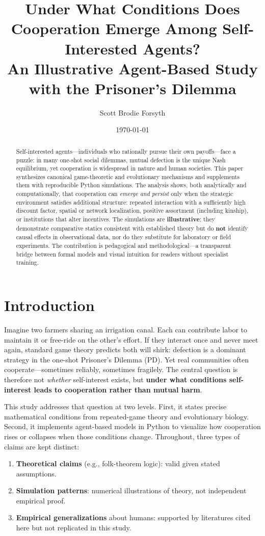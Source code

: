 \documentclass[11pt,a4paper]{article}
\title{\textbf{Under What Conditions Does Cooperation Emerge Among Self-Interested Agents?}\\[0.4em]
\large An Illustrative Agent-Based Study with the Prisoner's Dilemma}
\author{Scott Brodie Forsyth}
\date{\today}
\begin{document}
\maketitle

\begin{abstract}
Self-interested agents---individuals who rationally pursue their own payoffs---face a puzzle: in many one-shot social dilemmas, mutual defection is the unique Nash equilibrium, yet cooperation is widespread in nature and human societies. This paper synthesizes canonical game-theoretic and evolutionary mechanisms and supplements them with reproducible Python simulations. The analysis shows, both analytically and computationally, that cooperation can \emph{emerge and persist} only when the strategic environment satisfies additional structure: repeated interaction with a sufficiently high discount factor, spatial or network localization, positive assortment (including kinship), or institutions that alter incentives. The simulations are \textbf{illustrative}: they demonstrate comparative statics consistent with established theory but do \textbf{not} identify causal effects in observational data, nor do they substitute for laboratory or field experiments. The contribution is pedagogical and methodological---a transparent bridge between formal models and visual intuition for readers without specialist training.
\end{abstract}

\section{Introduction}

Imagine two farmers sharing an irrigation canal. Each can contribute labor to maintain it or free-ride on the other's effort. If they interact once and never meet again, standard game theory predicts both will shirk: defection is a dominant strategy in the one-shot Prisoner's Dilemma (PD). Yet real communities often cooperate---sometimes reliably, sometimes fragilely. The central question is therefore not \emph{whether} self-interest exists, but \textbf{under what conditions self-interest leads to cooperation rather than mutual harm}.

This study addresses that question at two levels. First, it states precise mathematical conditions from repeated-game theory and evolutionary biology. Second, it implements agent-based models in Python to visualize how cooperation rises or collapses when those conditions change. Throughout, three types of claims are kept distinct:
\begin{enumerate}[noitemsep]
  \item \textbf{Theoretical claims} (e.g., folk-theorem logic): valid given stated assumptions.
  \item \textbf{Simulation patterns}: numerical illustrations of theory, not independent empirical proof.
  \item \textbf{Empirical generalizations} about humans: supported by literatures cited here but not replicated in this study.
\end{enumerate}
\end{document}
